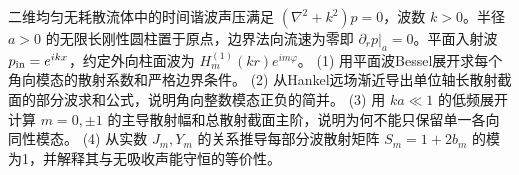 二维均匀无耗散流体中的时间谐波声压满足 \((\nabla^2+k^2)p=0\)，波数 \(k>0\)。半径 \(a>0\) 的无限长刚性圆柱置于原点，边界法向流速为零即 \(\partial_rp|_a=0\)。平面入射波 \(p_{\rm in}=e^{ikx}\)，约定外向柱面波为 \(H_m^{(1)}(kr)e^{im\varphi}\)。
(1) 用平面波Bessel展开求每个角向模态的散射系数和严格边界条件。
(2) 从Hankel远场渐近导出单位轴长散射截面的部分波求和公式，说明角向整数模态正负的简并。
(3) 用 \(ka\ll1\) 的低频展开计算 \(m=0,\pm1\) 的主导散射幅和总散射截面主阶，说明为何不能只保留单一各向同性模态。
(4) 从实数 \(J_m,Y_m\) 的关系推导每部分波散射矩阵 \(S_m=1+2b_m\) 的模为1，并解释其与无吸收声能守恒的等价性。

